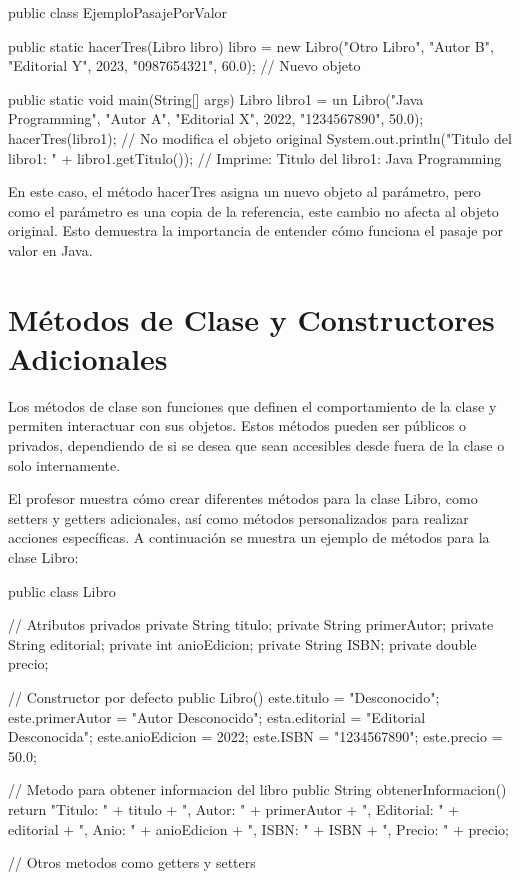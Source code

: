 \documentclass[a4paper]{report}
\begin{document}
\begin{roundedlst}
public class EjemploPasajePorValor {
    public static hacerTres(Libro libro) {
        libro = new Libro("Otro Libro", "Autor B", 
                          "Editorial Y", 2023,
                          "0987654321", 60.0);
                          // Nuevo objeto
    }

    public static void main(String[] args) {
        Libro libro1 = un Libro("Java Programming", 
                                "Autor A", "Editorial X", 
                                2022, "1234567890", 50.0);
        hacerTres(libro1); 
        // No modifica el objeto original
        System.out.println("Titulo del libro1: " + 
                           libro1.getTitulo());
        // Imprime: Titulo del libro1: Java Programming
    }
}

\end{roundedlst}

En este caso, el método hacerTres asigna un nuevo objeto al parámetro, pero como el parámetro es una copia de la referencia, este cambio no afecta al objeto original. Esto demuestra la importancia de entender cómo funciona el pasaje por valor en Java.

\section{Métodos de Clase y Constructores Adicionales}
Los métodos de clase son funciones que definen el comportamiento de la clase y permiten interactuar con sus objetos. Estos métodos pueden ser públicos o privados, dependiendo de si se desea que sean accesibles desde fuera de la clase o solo internamente.

El profesor muestra cómo crear diferentes métodos para la clase Libro, como setters y getters adicionales, así como métodos personalizados para realizar acciones específicas. A continuación se muestra un ejemplo de métodos para la clase Libro:

\begin{roundedlst}
public class Libro {
    // Atributos privados
    private String titulo;
    private String primerAutor;
    private String editorial;
    private int anioEdicion;
    private String ISBN;
    private double precio;

    // Constructor por defecto
    public Libro() {
        este.titulo = "Desconocido";
        este.primerAutor = "Autor Desconocido";
        esta.editorial = "Editorial Desconocida";
        este.anioEdicion = 2022;
        este.ISBN = "1234567890";
        este.precio = 50.0;
}

    // Metodo para obtener informacion del libro
    public String obtenerInformacion() {
        return "Titulo: " + titulo + ", Autor: " +
               primerAutor + ", Editorial: " + 
               editorial + ", Anio: " + anioEdicion + 
               ", ISBN: " + ISBN + ", Precio: " + precio;
    }

    // Otros metodos como getters y setters
}
\end{roundedlst}
\end{document}
